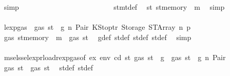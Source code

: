 \begin{isabellebody}
\ simp\isanewline
\ \ \ \ \ \ \ \ \ \ \ \ \ \ \ \ \ \ \ \ \ \ \ \ \isamarkupfalse%
\ stmt{\isacharunderscore}{\kern0pt}def\ \isamarkupfalse%
\ {\isachardoublequoteopen}st{}{\isacharprime}{\kern0pt}{\isacharequal}{\kern0pt}\ {\isacharparenleft}{\kern0pt}st{\isacharprime}{\kern0pt}{\isacharprime}{\kern0pt}{\isacharprime}{\kern0pt}{\isasymlparr}memory\ {\isacharcolon}{\kern0pt}{\isacharequal}{\kern0pt}\ m{\isasymrparr}{\isacharparenright}{\kern0pt}{\isachardoublequoteclose}\ \isamarkupfalse%
\ simp\isanewline
\ \ \ \ \ \ \ \ \ \ \ \ \ \ \ \ \ \ \ \ \ \ \ \ \isamarkupfalse%
\ \isamarkupfalse%
\ lexp{\isacharunderscore}{\kern0pt}gas\ {\isacharbackquoteopen}{\isasymnot}\ gas\ st\ {\isasymle}\ g{\isacharbackquoteclose}\ n\ Pair\ KStoptr\ Storage\ STArray\ n{}\ p{}\ \isamarkupfalse%
\ {\isachardoublequoteopen}gas\ {\isacharparenleft}{\kern0pt}st{\isacharprime}{\kern0pt}{\isacharprime}{\kern0pt}{\isacharprime}{\kern0pt}{\isasymlparr}memory\ {\isacharcolon}{\kern0pt}{\isacharequal}{\kern0pt}\ m{\isasymrparr}{\isacharparenright}{\kern0pt}\ {\isasymle}\ gas\ st{\isacharprime}{\kern0pt}{\isacharprime}{\kern0pt}{\isachardoublequoteclose}\ \isamarkupfalse%
\ g{\isacharunderscore}{\kern0pt}def\ st{\isacharprime}{\kern0pt}{\isacharunderscore}{\kern0pt}def\ st{\isacharprime}{\kern0pt}{\isacharprime}{\kern0pt}{\isacharunderscore}{\kern0pt}def\ st{\isacharprime}{\kern0pt}{\isacharprime}{\kern0pt}{\isacharprime}{\kern0pt}{\isacharunderscore}{\kern0pt}def\ \isamarkupfalse%
\ simp\isanewline
\ \ \ \ \ \ \ \ \ \ \ \ \ \ \ \ \ \ \ \ \ \ \ \ \isamarkupfalse%
\ \isamarkupfalse%
\ msel{\isacharunderscore}{\kern0pt}ssel{\isacharunderscore}{\kern0pt}expr{\isacharunderscore}{\kern0pt}load{\isacharunderscore}{\kern0pt}rexp{\isacharunderscore}{\kern0pt}gas{\isacharparenleft}{\kern0pt}{}{\isacharparenright}{\kern0pt}{\isacharbrackleft}{\kern0pt}of\ ex\ env\ cd\ st{\isacharprime}{\kern0pt}\ {\isachardoublequoteopen}gas\ st\ {\isacharminus}{\kern0pt}\ g{\isachardoublequoteclose}{\isacharbrackright}{\kern0pt}\ {\isacharbackquoteopen}{\isasymnot}\ gas\ st\ {\isasymle}\ g{\isacharbackquoteclose}\ n\ Pair\ \isamarkupfalse%
\ {\isachardoublequoteopen}gas\ st{\isacharprime}{\kern0pt}{\isacharprime}{\kern0pt}\ {\isasymle}\ gas\ st{\isacharprime}{\kern0pt}{\isachardoublequoteclose}\ \isamarkupfalse%
\ st{\isacharprime}{\kern0pt}{\isacharunderscore}{\kern0pt}def\ st{\isacharprime}{\kern0pt}{\isacharprime}{\kern0pt}{\isacharunderscore}{\kern0pt}def\ \isamarkupfalse%

\end{isabellebody}
